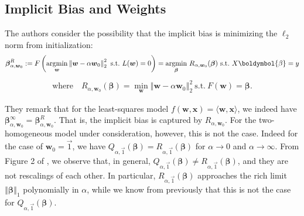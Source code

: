 \documentclass{article}
\begin{document}
\subsection{Implicit Bias and Weights}
The authors consider the possibility that the implicit bias is minimizing the $\ell_2$ norm from initialization:
\begin{align*}
    \boldsymbol{\beta}_{\alpha, \boldsymbol{w}_0}^R := F \left( \underset{\boldsymbol{w}}{\text{argmin}} \left\Vert \boldsymbol{w} - \alpha \boldsymbol{w}_0 \right\Vert_2^2 \ \text{s.t.} \ L(\boldsymbol{w}) = 0 \right) = \underset{\boldsymbol{\beta}}{\text{argmin}} \ R_{\alpha, \boldsymbol{w}_0}(\boldsymbol{\beta}) \ \text{s.t.} \ X \boldymbol{\beta} = y
\end{align*}
\begin{align*}
    \text{where} \quad R_{\alpha, \boldsymbol{w}_0}(\boldsymbol{\beta}) = \underset{\boldsymbol{w}}{\min} \left\Vert \boldsymbol{w} - \alpha \boldsymbol{w}_0 \right\Vert_2^2 \ \text{s.t.} \ F(\boldsymbol{w}) = \boldsymbol{\beta}.
\end{align*}

They remark that for the least-squares model $f(\boldsymbol{w}, \boldsymbol{x}) = \langle \boldsymbol{w}, \boldsymbol{x} \rangle$, we indeed have $\boldsymbol{\beta}_{\alpha, \boldsymbol{w}_0}^{\infty} = \boldsymbol{\beta}_{\alpha, \boldsymbol{w}_0}^{R}$. That is, the implicit bias is captured by $R_{\alpha, \boldsymbol{w}_0}$. For the two-homogeneous model under consideration, however, this is not the case. Indeed for the case of $\boldsymbol{w}_0 = \vec{1}$, we have $Q_{\alpha, \vec{1}}(\boldsymbol{\beta}) = R_{\alpha, \vec{1}}(\boldsymbol{\beta})$ for $\alpha \rightarrow 0$ and $\alpha \rightarrow \infty$. From Figure 2 of \cite{woodworth2020kernel}, we observe that, in general, $Q_{\alpha, \vec{1}}(\boldsymbol{\beta}) \neq R_{\alpha, \vec{1}}(\boldsymbol{\beta})$, and they are not rescalings of each other. In particular, $R_{\alpha, \vec{1}}(\boldsymbol{\beta})$ approaches the rich limit $\left\Vert \boldsymbol{\beta} \right\Vert_1$ polynomially in $\alpha$, while we know from previously that this is not the case for $Q_{\alpha, \vec{1}}(\boldsymbol{\beta})$.
\end{document}
